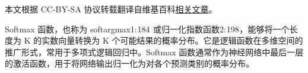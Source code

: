 
本文根据 CC-BY-SA 协议转载翻译自维基百科\href{https://en.wikipedia.org/wiki/Softmax_function}{相关文章}。

Softmax 函数，也称为 softargmax1: 184  或归一化指数函数2: 198 ，能够将一个长度为 K 的实数向量转换为 K 个可能结果的概率分布。它是逻辑函数在多维空间的推广形式，常用于多项式逻辑回归中。Softmax 函数通常作为神经网络中最后一层的激活函数，用于将网络输出归一化为对各个预测类别的概率分布。

